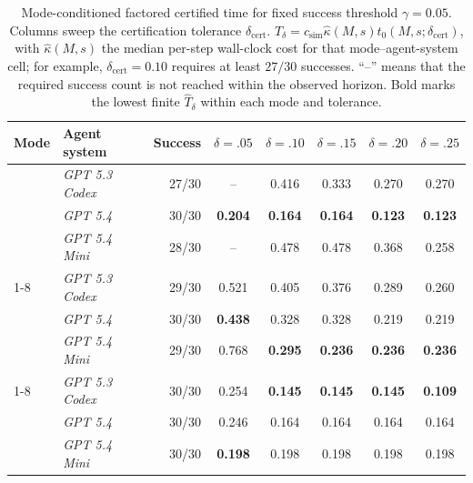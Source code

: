 \documentclass{article}
\newcommand{\multirow}[3]{##3}%
\begin{document}
\begin{table}[t]
\centering
\scriptsize
\setlength{\tabcolsep}{2.4pt}
\caption{Mode-conditioned factored certified time for fixed success threshold \(\gamma=0.05\).
Columns sweep the certification tolerance \(\delta_{\mathrm{cert}}\).
\(\widehat T_{\delta}=c_{\mathrm{sim}}\widehat\kappa(M,s)\widehat t_0(M,s;\delta_{\mathrm{cert}})\), with \(\widehat\kappa(M,s)\) the median per-step wall-clock cost for that mode--agent-system cell; for example, \(\delta_{\mathrm{cert}}=0.10\) requires at least \(27/30\) successes.
``--'' means that the required success count is not reached within the observed horizon.
Bold marks the lowest finite \(\widehat T_{\delta}\) within each mode and tolerance.}
\label{tab:worker-frontier-accounting}
\begin{tabular}{@{}llrccccc@{}}
\toprule
Mode & Agent system & Success & \(\delta=.05\) & \(\delta=.10\) & \(\delta=.15\) & \(\delta=.20\) & \(\delta=.25\) \\
\midrule
\multirow{3}{*}{\textit{MLP}} & \textit{GPT 5.3 Codex} & 27/30 & -- & 0.416 & 0.333 & 0.270 & 0.270 \\
& \textit{GPT 5.4} & 30/30 & \textbf{0.204} & \textbf{0.164} & \textbf{0.164} & \textbf{0.123} & \textbf{0.123} \\
& \textit{GPT 5.4 Mini} & 28/30 & -- & 0.478 & 0.478 & 0.368 & 0.258 \\
\cmidrule(lr){1-8}
\multirow{3}{*}{\textit{CNN}} & \textit{GPT 5.3 Codex} & 29/30 & 0.521 & 0.405 & 0.376 & 0.289 & 0.260 \\
& \textit{GPT 5.4} & 30/30 & \textbf{0.438} & 0.328 & 0.328 & 0.219 & 0.219 \\
& \textit{GPT 5.4 Mini} & 29/30 & 0.768 & \textbf{0.295} & \textbf{0.236} & \textbf{0.236} & \textbf{0.236} \\
\cmidrule(lr){1-8}
\multirow{3}{*}{\textit{ResNet}} & \textit{GPT 5.3 Codex} & 30/30 & 0.254 & \textbf{0.145} & \textbf{0.145} & \textbf{0.145} & \textbf{0.109} \\
& \textit{GPT 5.4} & 30/30 & 0.246 & 0.164 & 0.164 & 0.164 & 0.164 \\
& \textit{GPT 5.4 Mini} & 30/30 & \textbf{0.198} & 0.198 & 0.198 & 0.198 & 0.198 \\
\bottomrule
\end{tabular}
\end{table}
\end{document}
